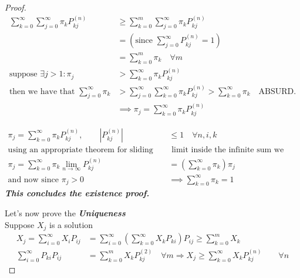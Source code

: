 \begin{proof}
		\proofpart
			\begin{equation*}
				\begin{split}
					\sum\limits_{k=0}^\infty \sum\limits_{j=0}^\infty \pi_k P_{kj}^{(n)} &\geq
					\sum\limits_{k=0}^m \sum\limits_{j=0}^\infty \pi_k P_{kj}^{(n)}  \\
					&=(\text{since } \sum\limits_{j=0}^\infty P_{kj}^{(n)} = 1 )\\
					&=\sum\limits_{k=0}^m \pi_k \quad \forall m\\
					\text{suppose } \exists j > 1 : \pi_j &> \sum\limits_{k=0}^\infty \pi_k P_{kj}^{(n)} \\
					\text{then we have that } \sum\limits_{j=0}^\infty \pi_k &> \sum\limits_{j=0}^\infty \sum\limits_{k=0}^\infty \pi_k P_{kj}^{(n)} > \sum\limits_{k=0}^\infty \pi_k \quad \text{ABSURD.} \\
					&\implies \pi_j = \sum\limits_{k=0}^\infty \pi_k P_{kj}^{(n)}
				\end{split}
			\end{equation*}

		\proofpart
			\begin{equation*}
				\begin{split}
			 		\pi_j = \sum\limits_{k=0}^\infty \pi_k P_{kj}^{(n)}, \qquad |P_{kj}^{(n)}| &\leq 1 \quad \forall n,i,k \\
					\text{using an appropriate theorem for sliding the}&\text{ limit inside the infinite sum we have:}\\
					\pi_j = \sum\limits_{k=0}^\infty  \pi_k \lim_{n\to\infty} P_{kj}^{(n)} &= (\sum\limits_{k=0}^\infty \pi_k) \pi_j\\
					\text{and now since $\pi_j>0$}
					&\implies \sum\limits_{k=0}^\infty \pi_k = 1
				\end{split}
			\end{equation*}
			\textbf{\textit{This concludes the existence proof.}}

		\proofpart
			Let's now prove the \textbf{\textit{Uniqueness}} \\
			Suppose $X_j$ is a solution
			\begin{equation}
				\begin{split}
					X_j =
					 \sum\limits_{i=0}^\infty X_i P_{ij} &=
					 \sum\limits_{i=0}^\infty ( \sum\limits_{k=0}^\infty X_k P_{ki} ) P_{ij} \geq
					 \sum\limits_{k=0}^m X_k \\
					 \sum\limits_{i=0}^\infty P_{ki} P_{ij} &= \sum\limits_{k=0}^m X_k P_{kj}^{(2)}
					 \quad \forall m
					 \Rightarrow X_j \geq \sum\limits_{k=0}^\infty X_k P_{kj}^{(n)}\qquad \forall n
				\end{split}
			\end{equation}


\end{proof}
